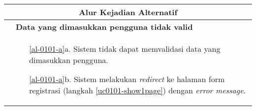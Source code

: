 \begin{table}[H]
\begin{tabular}{|r|p{8cm}|}
		\\ \hline
		\multicolumn{2}{|c|}{\textbf{Alur Kejadian Alternatif}}                                                         \\ \hline
		\multicolumn{1}{|l|}{}                                           & \textbf{Data yang dimasukkan pengguna tidak valid}
			\\ \hline
		\multicolumn{1}{|l|}{}                                           & 
			 \begin{itemize}
			 	\item[\ref{al-0101-a}a.] Sistem tidak dapat memvalidasi data yang dimasukkan pengguna.
			 	\item[\ref{al-0101-a}b.] Sistem melakukan \textit{redirect} ke halaman form registrasi (langkah \ref{uc0101-show1page}) dengan \textit{error message}.
			 \end{itemize}
		 \\ \hline
	\end{tabular}
\end{table}